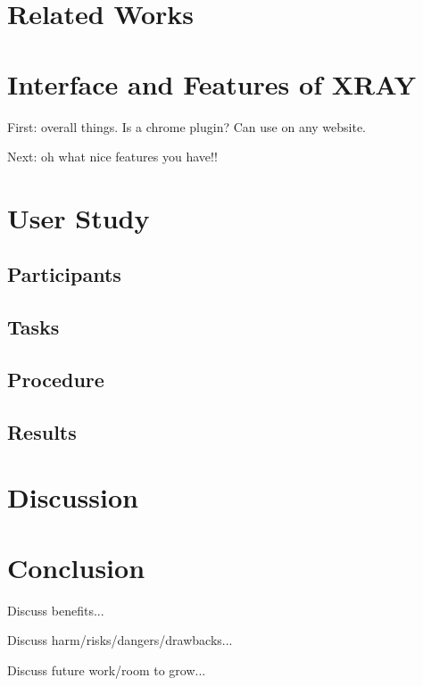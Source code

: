 \documentclass{sigchi-ext}
\begin{document}
\section{Related Works}

\section{Interface and Features of XRAY}
First: overall things. Is a chrome plugin? Can use on any website. 

Next: oh what nice features you have!!
\section{User Study}
\subsection{Participants}
\subsection{Tasks}
\subsection{Procedure}
\subsection{Results}

\section{Discussion}

\section{Conclusion}
Discuss benefits...

Discuss harm/risks/dangers/drawbacks...

Discuss future work/room to grow...










\balance{} 



\end{document}
